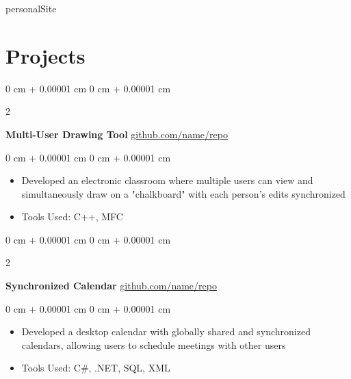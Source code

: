 personalSite\documentclass[10pt, letterpaper]{article}
\newenvironment{highlights}{
    \begin{itemize}[
        topsep=0.10 cm,
        parsep=0.10 cm,
        partopsep=0pt,
        itemsep=0pt,
        leftmargin=0 cm + 10pt
    ]
}{
    \end{itemize}
} %
\newenvironment{onecolentry}{
    \begin{adjustwidth}{
        0 cm + 0.00001 cm
    }{
        0 cm + 0.00001 cm
    }
}{
    \end{adjustwidth}
} %
\newenvironment{twocolentry}[2][]{
    \onecolentry
    \def\secondColumn{#2}
    \setcolumnwidth{\fill, 4.5 cm}
    \begin{paracol}{2}
}{
    \switchcolumn \raggedleft \secondColumn
    \end{paracol}
    \endonecolentry
} %
\begin{document}
            

                


    
    \section{Projects}



        
        \begin{twocolentry}{
            \href{https://github.com/sinaatalay/rendercv}{github.com/name/repo}
        }
            \textbf{Multi-User Drawing Tool}\end{twocolentry}

        \vspace{0.10 cm}
        \begin{onecolentry}
            \begin{highlights}
                \item Developed an electronic classroom where multiple users can view and simultaneously draw on a "chalkboard" with each person's edits synchronized
                \item Tools Used: C++, MFC
            \end{highlights}
        \end{onecolentry}


        \vspace{0.2 cm}

        \begin{twocolentry}{
            \href{https://github.com/sinaatalay/rendercv}{github.com/name/repo}
        }
            \textbf{Synchronized Calendar}\end{twocolentry}

        \vspace{0.10 cm}
        \begin{onecolentry}
            \begin{highlights}
                \item Developed a desktop calendar with globally shared and synchronized calendars, allowing users to schedule meetings with other users
                \item Tools Used: C\#, .NET, SQL, XML
            \end{highlights}
        \end{onecolentry}
\end{document}

